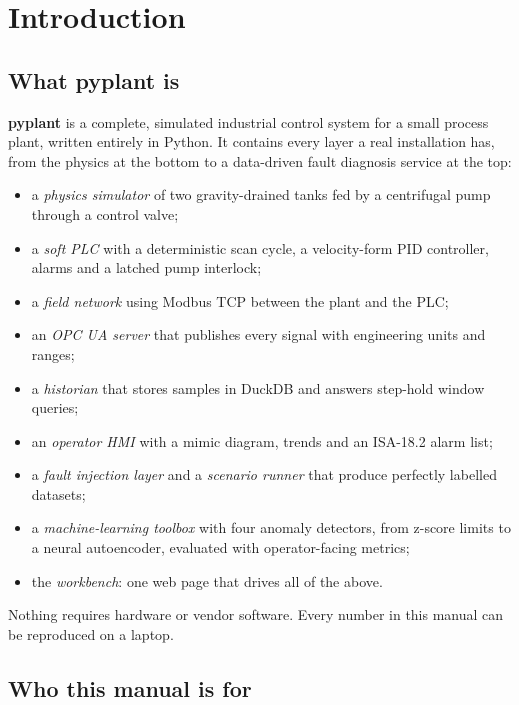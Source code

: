 \chapter{Introduction}
\label{ch:intro}

\section{What pyplant is}

\textbf{pyplant} is a complete, simulated industrial control system for a
small process plant, written entirely in Python. It contains every layer a
real installation has, from the physics at the bottom to a data-driven fault
diagnosis service at the top:

\begin{itemize}
  \item a \emph{physics simulator} of two gravity-drained tanks fed by a
        centrifugal pump through a control valve;
  \item a \emph{soft PLC} with a deterministic scan cycle, a velocity-form PID
        controller, alarms and a latched pump interlock;
  \item a \emph{field network} using Modbus TCP between the plant and the PLC;
  \item an \emph{OPC UA server} that publishes every signal with engineering
        units and ranges;
  \item a \emph{historian} that stores samples in DuckDB and answers
        step-hold window queries;
  \item an \emph{operator HMI} with a mimic diagram, trends and an
        ISA-18.2 alarm list;
  \item a \emph{fault injection layer} and a \emph{scenario runner} that
        produce perfectly labelled datasets;
  \item a \emph{machine-learning toolbox} with four anomaly detectors, from
        z-score limits to a neural autoencoder, evaluated with operator-facing
        metrics;
  \item the \emph{workbench}: one web page that drives all of the above.
\end{itemize}

Nothing requires hardware or vendor software. Every number in this manual can
be reproduced on a laptop.

\section{Who this manual is for}

